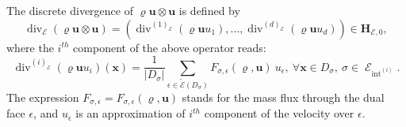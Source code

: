 \documentclass{amsart}
\numberwithin{equation}{section}
\begin{document}
\medskip
{} The discrete divergence of $ {\varrho} {{\boldsymbol u}} \otimes {{\boldsymbol u}} $  is defined by  
\begin{equation}
  \operatorname{div}_\operatorname{{\mathcal{E}}} ({\varrho} {{\boldsymbol u}} \otimes {{\boldsymbol u}}) = ( \operatorname{div}^{(1)}_\operatorname{{\mathcal{E}}}({\varrho}  {{\boldsymbol u}} u_1),..., \operatorname{div}^{(d)}_\operatorname{{\mathcal{E}}}({\varrho}  {{\boldsymbol u}} u_d)) \in {{\mathbf{H}_{{{\mathcal E}},0}}},
\end{equation}
where the $i^{th}$ component of the above operator reads:
\[
 \operatorname{div}^{(i)}_\operatorname{{\mathcal{E}}}({\varrho}  {{\boldsymbol u}} u_i) ({{\boldsymbol x}}) = \frac{1}{|D_{{\sigma}}|} \sum_{{\epsilon}\in{\widetilde {{\mathcal E}}}(D_{{\sigma}})} F_{{{\sigma}},{\epsilon}}({\varrho},{{\boldsymbol u}})\ u_{\epsilon}, \ \forall {{\boldsymbol x}} \in D_{{\sigma}}, \ {{\sigma}} \in \operatorname{{\mathcal{E}}}_\operatorname{int}^{(i)}.
\]
The expression ${F_{{{\sigma}},{\epsilon}}} = {F_{{{\sigma}},{\epsilon}}}({\varrho},{{\boldsymbol u}})$ stands for the mass flux through the dual face ${\epsilon}$, and $u_{\epsilon} $ is an approximation of $i^{th}$ component of the velocity over ${\epsilon}$.
\end{document}
